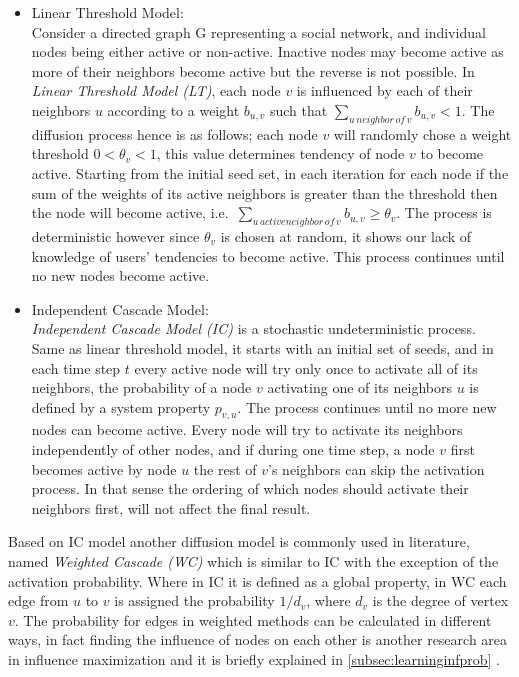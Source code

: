 \documentclass[english]{tktltiki}
\begin{document}
\begin{itemize}
\item Linear Threshold Model:\\
Consider a directed graph G representing a social network, and individual nodes being either active or non-active. Inactive nodes may become active as more of their neighbors become active but the reverse is not possible. In \textit{Linear Threshold Model (LT)}, each node $v$ is influenced by each of their neighbors $u$ according to a weight $b_{u,v}$ such that $\sum \nolimits_{u \, neighbor \, of \, v} b_{u,v} < 1$. The diffusion process hence is as follows; each node $v$ will randomly chose a weight threshold $0 < \theta_v<1 $, this value determines tendency of node $v$ to become active. Starting from the initial seed set, in each iteration for each node if the sum of the weights of its active neighbors is greater than the threshold then the node will become active, i.e.\ $\sum \nolimits_{u \, active neighbor \, of \, v} b_{u,v}  \geq \theta_v $. The process is deterministic however since $\theta_v$ is chosen at random, it shows our lack of knowledge of users' tendencies to become active. This process continues until no new nodes become active.

\item Independent Cascade Model:\\ 
 \textit{Independent Cascade Model (IC)} is a stochastic undeterministic process. Same as linear threshold model, it starts with an initial set of seeds, and in each time step $t$ every active node will try only once to activate all of its neighbors, the probability of a node $v$ activating one of its neighbors $u$ is defined by a system property $p_{v,u}$. The process continues until no more new nodes can become active. Every node will try to activate its neighbors independently of other nodes, and if during one time step, a node $v$ first becomes active by node $u$ the rest of $v$'s neighbors can skip the activation process. In that sense the ordering of which nodes should activate their neighbors first, will not affect the final result.
\end{itemize}
Based on IC model another diffusion model is commonly used in literature, named \textit{Weighted Cascade (WC)} which is similar to IC with the exception of the activation probability. Where in IC it is defined as a global property, in WC each edge from $u$ to $v$ is assigned the probability $1/d_v$, where $d_v$ is the degree of vertex $v$. The probability for edges in weighted methods can be calculated in different ways, in fact finding the influence of nodes on each other is another research area in influence maximization and it is briefly explained in \ref{subsec:learninginfprob} .
\end{document}
